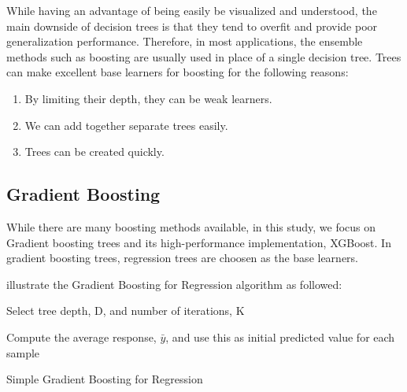While having an advantage of being easily be visualized and understood, the main
downside of decision trees is that they tend to overfit and provide poor
generalization performance.  Therefore, in most applications, the ensemble
methods such as boosting are usually used in place of a single decision tree.
Trees can make excellent base learners for boosting for the following reasons:
\begin{enumerate}
    \item By limiting their depth, they can be weak learners.
    \item We can add together separate trees easily.
    \item Trees can be created quickly.
\end{enumerate}

\subsection{Gradient Boosting}

While there are many boosting methods available, in this study, we focus on
Gradient boosting trees and its high-performance implementation, XGBoost. In
gradient boosting trees,  regression trees are choosen  as the base learners.


\textcite{kuhn2013applied} illustrate the Gradient Boosting for
Regression algorithm as followed:

\begin{algorithm}[H]
\SetAlgoLined

\renewcommand{\labelenumi}{(\Roman{enumi})}
Select tree depth, D, and number of iterations, K

Compute the average response, $\bar{y}$, and use this as initial predicted value for each sample

 \caption{Simple Gradient Boosting for Regression}
\end{algorithm}
